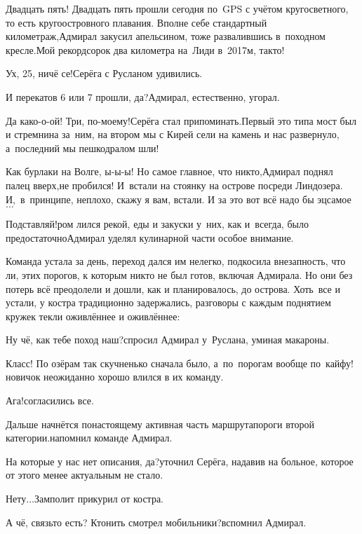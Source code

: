 \diagdash Двадцать пять! Двадцать пять прошли сегодня по~GPS с учётом кругосветного, то есть кругоостровного плавания. Вполне себе стандартный километраж,\mdash Адмирал закусил апельсином, тоже развалившись в~походном кресле.\mdash Мой рекорд\mdash сорок два километра на~Лиди в~2017\sdash м, так\sdash то!

\diagdash Ух, 25, ничё се!\mdash Серёга с Русланом удивились.

\diagdash И перекатов 6 или 7 прошли, да?\mdash Адмирал, естественно, угорал.

\diagdash Да како-о-ой! Три, по-моему!\mdash Серёга стал припоминать.\mdash Первый это типа мост был и стремнина за~ним, на втором мы с Кирей сели на камень и нас развернуло, а~последний мы пешкодралом шли!

\diagdash Как бурлаки на Волге, ы-ы-ы! Но самое главное, что никто,\mdash Адмирал поднял палец вверх,\mdash не пробился! И~встали на стоянку на острове посреди Линдозера. И,~в~принципе, неплохо, скажу я вам, встали. И за это вот всё надо бы эц\sdash самое$\ldots$

\diagdash Подставляй!\mdash ром лился рекой, еды и закуски у~них, как и~всегда, было предостаточно\mdash Адмирал уделял кулинарной части особое внимание.

Команда устала за день, переход дался им нелегко, подкосила внезапность, что ли, этих порогов, к которым никто не был готов, включая Адмирала. Но они без потерь всё преодолели и дошли, как и планировалось, до острова. Хоть~все и устали, у костра традиционно задержались, разговоры с каждым поднятием кружек текли оживлённее и оживлённее:

\diagdash Ну чё, как тебе поход наш?\mdash спросил Адмирал у~Руслана, уминая макароны.

\diagdash Класс! По озёрам так скучненько сначала было, а~по~порогам вообще по~кайфу!\mdash новичок неожиданно хорошо влился в их команду.

\diagdash Ага!\mdash согласились все.

\diagdash Дальше начнётся по\sdash настоящему активная часть маршрута\mdash пороги второй категории.\mdash напомнил команде Адмирал.

\diagdash На которые у нас нет описания, да?\mdash уточнил Серёга, надавив на больное, которое от этого менее актуальным не стало.

\diagdash Нету$\ldots$\mdash Замполит прикурил от костра.

\diagdash А чё, связь\sdash то есть? Кто\sdash нить смотрел мобильники?\mdash вспомнил Адмирал.

